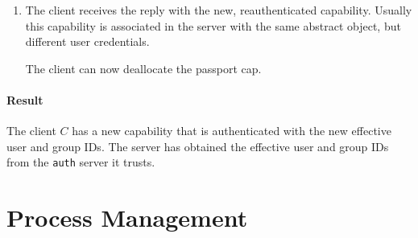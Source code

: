 \begin{enumerate}
  \begin{comment}
    The verification of the client's task ID is necessary.  As the
    passport cap is copied to other tasks, it can not serve as a proof
    of identity alone.  It is of course absolutely crucial that the
    server holds the task info cap for the client task $C$ for the
    whole time of the protocol.  But the same is actually true for any
    RPC, as the server needs to be sure that the reply message is sent
    to the sender thread (and not any imposter).
  \end{comment}
  
\item The client receives the reply with the new, reauthenticated
  capability.  Usually this capability is associated in the server
  with the same abstract object, but different user credentials.

  \begin{comment}
    Of course a new capability must be created.  Otherwise, all other
    users holding the same capability would be affected as well.
  \end{comment}

  The client can now deallocate the passport cap.

  \begin{comment}
    As said before, normally the passport cap is cached by the client
    for other reauthentications.
  \end{comment}
\end{enumerate}

\paragraph{Result}
The client $C$ has a new capability that is authenticated with the new
effective user and group IDs.  The server has obtained the effective
user and group IDs from the \texttt{auth} server it trusts.

\begin{comment}
  The Hurd on Mach uses a different protocol, which is more complex
  and is vulnerable to DoS attacks.  The above protocol can not
  readily be used on Mach, because the sender task of a message can
  not be easily identified.
\end{comment}


\section{Process Management}
\label{proc}

